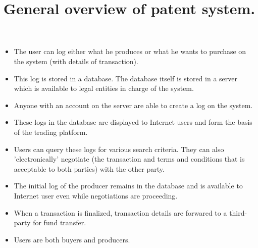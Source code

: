 \documentclass{article}
\title{General overview of patent system.}
\author{}
\date{}
\begin{document}
\maketitle
\begin{itemize}
\item The user can log either what he produces or what he wants to purchase on the system (with details of transaction).
\item This log is stored in a database. The database itself is stored in a server which is available to legal entities in charge of the system.
\item Anyone with an account on the server are able to create a log on the system.
\item These logs in the database are displayed to Internet users and form the basis of the trading platform.
\item Users can query these logs for various search criteria. They can also 'electronically' negotiate (the transaction and terms and conditions that is acceptable to both parties) with the other party.
\item The initial log of the producer remains in the database and is available to Internet user even while negotiations are proceeding.
\item When a transaction is finalized, transaction details are forwared to a third-party for fund transfer.
\item Users are both buyers and producers.
\end{itemize}
\end{document}
